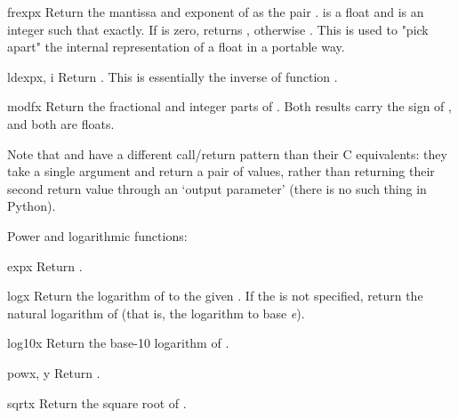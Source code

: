 \begin{funcdesc}{frexp}{x}
Return the mantissa and exponent of  as the pair
.   is a float and  is an
integer such that  exactly.
If  is zero, returns , otherwise
.  This is used to "pick apart" the
internal representation of a float in a portable way.
\end{funcdesc}

\begin{funcdesc}{ldexp}{x, i}
Return .  This is essentially the inverse of
function .
\end{funcdesc}

\begin{funcdesc}{modf}{x}
Return the fractional and integer parts of .  Both results
carry the sign of , and both are floats.
\end{funcdesc}

Note that  and  have a different
call/return pattern than their C equivalents: they take a single
argument and return a pair of values, rather than returning their
second return value through an `output parameter' (there is no such
thing in Python).

Power and logarithmic functions:

\begin{funcdesc}{exp}{x}
Return .
\end{funcdesc}

\begin{funcdesc}{log}{x}
Return the logarithm of  to the given .
If the  is not specified, return the natural logarithm of 
(that is, the logarithm to base \emph{e}).
\end{funcdesc}

\begin{funcdesc}{log10}{x}
Return the base-10 logarithm of .
\end{funcdesc}

\begin{funcdesc}{pow}{x, y}
Return .
\end{funcdesc}

\begin{funcdesc}{sqrt}{x}
Return the square root of .
\end{funcdesc}

